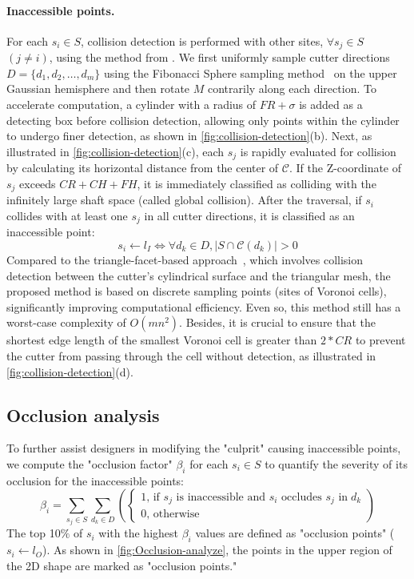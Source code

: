 \paragraph{Inaccessible points.} 
For each $s_i \in S$, collision detection is performed with other sites, $\forall s_j\in S$ $(j \neq i)$, using the method from \cite{zhong2023vasco}. We first uniformly sample cutter directions $D = \{d_1, d_2, \dots, d_m\}$ using the Fibonacci Sphere sampling method~\cite{vorobiev2002fibonacci} on the upper Gaussian hemisphere and then rotate $M$ contrarily along each direction. To accelerate computation, a cylinder with a radius of $FR + \sigma$ is added as a detecting box before collision detection, allowing only points within the cylinder to undergo finer detection, as shown in \autoref{fig:collision-detection}(b).
Next, as illustrated in \autoref{fig:collision-detection}(c), each $s_j$ is rapidly evaluated for collision by calculating its horizontal distance from the center of $\mathcal{C}$. If the Z-coordinate of $s_j$ exceeds $CR + CH + FH$, it is immediately classified as colliding with the infinitely large shaft space (called global collision). 
After the traversal, if $s_i$ collides with at least one $s_j$ in all cutter directions, it is classified as an inaccessible point:
\begin{equation} 
s_i \leftarrow l_I \iff \forall d_k \in D, |S \cap \mathcal{C}(d_k)| > 0
\end{equation}
Compared to the triangle-facet-based approach~\cite{dhaliwal2003algorithms}, which involves collision detection between the cutter’s cylindrical surface and the triangular mesh, the proposed method is based on discrete sampling points (sites of Voronoi cells), significantly improving computational efficiency.
Even so, this method still has a worst-case complexity of $O(mn^2)$. Besides, it is crucial to ensure that the shortest edge length of the smallest Voronoi cell is greater than $2*CR$ to prevent the cutter from passing through the cell without detection, as illustrated in \autoref{fig:collision-detection}(d).



\subsection{Occlusion analysis}
To further assist designers in modifying the "culprit" causing inaccessible points, we compute the "occlusion factor" $\beta_i$ for each $s_i \in S$ to quantify the severity of its occlusion for the inaccessible points:
\begin{equation} 
\beta_i = \sum_{s_j \in S}\sum_{d_k \in D} \left(
\begin{cases} 
1  \text{, if } s_j \text{ is inaccessible and } s_i \text{ occludes } \text{$s_j$ in} \; d_k \\
0  \text{, otherwise}
\end{cases} \right)
\end{equation}
The top 10$\%$ of $s_i$ with the highest $\beta_i$ values are defined as "occlusion points" ($s_i \leftarrow l_O$). As shown in \autoref{fig:Occlusion-analyze}, the points in the upper region of the 2D shape are marked as "occlusion points."



